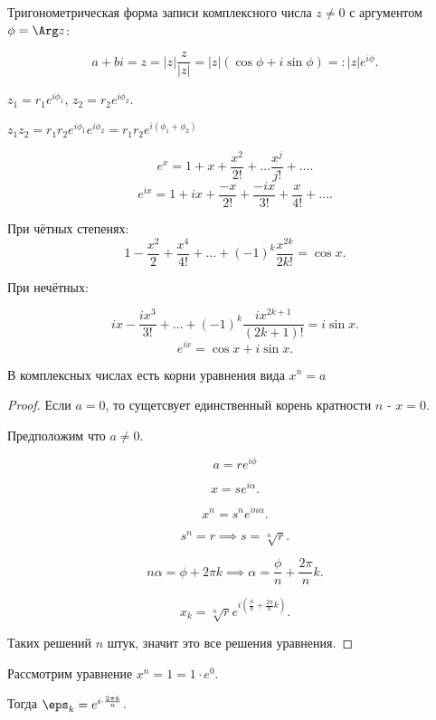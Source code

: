 \begin{definition} 
    Тригонометрическая форма записи комплексного числа $z \neq 0$ с аргументом $\phi = \Arg z$:

    \[ a+bi = z = |z| \frac{z}{|z|} = |z| \left( \cos \phi + i\sin \phi \right) =: |z|e^{i\phi}.\] 
\end{definition}
\begin{property} 
    $z_1 = r_1e^{i\phi_1}$, $z_2 = r_2e^{i\phi_2}$.

    $z_1z_2 = r_1r_2 e^{i\phi_1} e^{i\phi_2} = r_1r_2 e^{i(\phi_1 + \phi_2)}$
\end{property}
\begin{remark} 
    \[ e^{x} = 1 + x + \frac{x^2}{2!} + \ldots \frac{x^{j}}{j!} + \ldots .\]
    \[ e^{ix} = 1 + ix + \frac{-x}{2!} + \frac{-ix}{3!} + \frac{x}{4!} + \ldots .\]

    При чётных степенях:
    \[ 1 - \frac{x^2}{2} + \frac{x^{4}}{4!} + \ldots + (-1)^{k} \frac{x^{2k}}{2k!} = \cos x.\]
    
    При нечётных:
    
    \[ ix - \frac{ix^3}{3!} + \ldots + (-1)^{k}\frac{ix^{2k+1}}{(2k+1)!} = i\sin x.\]
    \[ e^{ix} = \cos x + i\sin x .\] 
\end{remark}
\begin{theorem} 
    В комплексных числах есть корни уравнения вида $x^{n} = a$
    \begin{proof}
        Если $a=0$, то сущетсвует единственный корень кратности $n$ - $x=0$.
        
        Предположим что $a\neq 0$.
    
        \[ a = re^{i\phi} \] 

        \[ x = s e^{i\alpha} .\]
        
        \[ x^{n} = s^{n} e^{in\alpha} .\]

        \[ s^{n} = r \implies s = \sqrt[n]{r}  .\]

        \[ n\alpha = \phi + 2\pi k \implies \alpha = \frac{\phi}{n} + \frac{2\pi}{n}k.\]
        
        \[ x_k = \sqrt[n]{r} e^{i\left( \frac{\phi}{n} + \frac{2\pi}{n}k \right) }  .\]

        Таких решений $n$ штук, значит это все решения уравнения.
    \end{proof}
\end{theorem}
\begin{example} 
    Рассмотрим уравнение $x^{n} = 1 = 1 \cdot e^{0}$.

    Тогда $\eps_k = e^{i \cdot \frac{2\pi k}{n}}$. 
\end{example}
